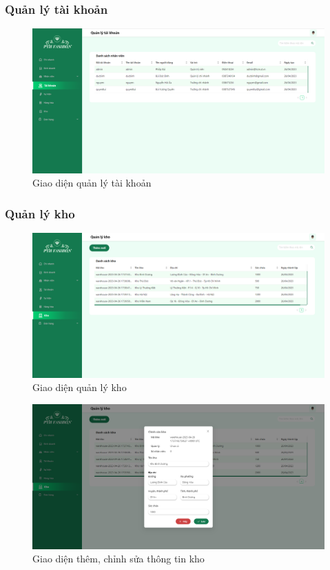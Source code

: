 
\newpage

\subsubsection{Quản lý tài khoản}
\begin{figure}[!htp]
    \centering
    \includegraphics[width=12cm]{img/UI/admin_implement/account.png}
    \newline
    \caption{Giao diện quản lý tài khoản}
\end{figure}


\subsubsection{Quản lý kho}
\begin{figure}[!htp]
    \centering
    \includegraphics[width=12cm]{img/UI/admin_implement/warehouse.png}
    \newline
    \caption{Giao diện quản lý kho}
\end{figure}


\begin{figure}[!htp]
    \centering
    \includegraphics[width=12cm]{img/UI/admin_implement/warehouseEdit.png}
    \newline
    \caption{Giao diện thêm, chỉnh sửa thông tin kho}
\end{figure}


